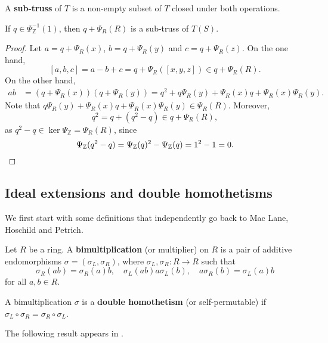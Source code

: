 \documentclass{svmult}
\newcommand{\Z}{\mathbb{Z}}
\begin{document}
A \textbf{sub-truss} of $T$ is a non-empty subset of $T$ closed under both operations. 

\begin{proposition}
    If $q\in\Psi_{\Z}^{-1}(1)$, then 
    $q+\Psi_R(R)$ is a sub-truss of $T(S)$. 
\end{proposition}

\begin{proof}
    Let $a=q+\Psi_R(x)$, $b=q+\Psi_R(y)$ and $c=q+\Psi_R(z)$. On the one hand,
    \[
    [a,b,c]=a-b+c=q+\Psi_R([x,y,z])\in q+\Psi_R(R).
    \]
    On the other hand, 
    \begin{align*}
        ab &= (q+\Psi_R(x))(q+\Psi_R(y)) 
        = q^2+q\Psi_R(y)+\Psi_R(x)q+\Psi_R(x)\Psi_R(y).
    \end{align*}
    Note that $q\Psi_R(y)+\Psi_R(x)q+\Psi_R(x)\Psi_R(y)\in\Psi_R(R)$. Moreover, 
    \[
    q^2=q+(q^2-q)\in q+\Psi_R(R),
    \]
    as $q^2-q\in\ker\Psi_{\Z}=\Psi_R(R)$, since 
    \[
    \Psi_{\Z}(q^2-q)=\Psi_{\Z}(q)^2-\Psi_{\Z}(q)=1^2-1=0.\qedhere 
    \]
\end{proof}

\subsection{Ideal extensions and double homothetisms}

We first start with some definitions that independently 
go back to Mac Lane, Hoschild
and Petrich. 

\begin{definition}
Let $R$ be a ring. A \textbf{bimultiplication} (or multiplier) on $R$ is a pair of additive
endomorphisms $\sigma=(\sigma_L,\sigma_R)$, where 
$\sigma_L,\sigma_R\colon R\to R$ such that
\[
\sigma_R(ab)=\sigma_R(a)b,\quad
\sigma_L(ab)a\sigma_L(b),\quad
a\sigma_R(b)=\sigma_L(a)b
\]
for all $a,b\in R$. 
\end{definition}

\begin{definition}
    A bimultiplication $\sigma$ is a \textbf{double homothetism} (or self-permutable)
    if $\sigma_L\circ \sigma_R=\sigma_R\circ \sigma_L$.
\end{definition}

The following result appears in \cite{MR4396016}. 
\end{document}
